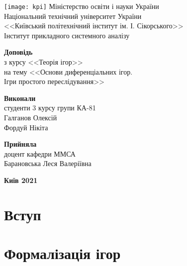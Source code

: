 \documentclass{extreport}
\begin{document}
\begin{titlepage}
    \thispagestyle{empty}
    \begin{center}
        \texttt{[image: kpi]}
        Міністерство освіти і науки України\\
        Національний технічний університет України\\
        <<Київський політехнічний інститут ім. І. Сікорського>>\\
        Інститут прикладного системного аналізу
    \end{center}
    \vspace{30mm}
    \begin{center}
        \fontsize{22}{26}\selectfont\textbf{Доповідь} \\
        з курсу <<Теорія ігор>> \\
        на тему <<Основи диференціальних ігор. \\ Ігри простого переслідування>>
    \end{center}
    \vspace{30mm}
    \begin{flushleft}
        \textbf{Виконали} \\ 
        студенти 3 курсу групи КА-81 \\
        Галганов Олексій \\
        Фордуй Нікіта
    \end{flushleft}
    \begin{flushright}
        \textbf{Прийняла} \\
        доцент кафедри ММСА \\
        Барановська Леся Валеріївна
    \end{flushright}
    \vspace{30mm}
    \begin{center}
        \textbf{Київ 2021}
    \end{center}
\end{titlepage}
\tableofcontents
    \chapter{Вступ}
        
    \chapter{Формалізація ігор}
        
\end{document}
